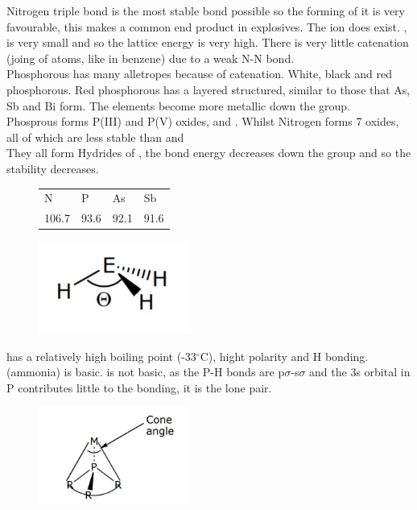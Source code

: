 \documentclass{article}
\begin{document}
    Nitrogen triple bond is the most stable bond possible so the forming of it is very favourable, this makes 
     a common end product in explosives. The  ion does exist. , 
    is very small and so the lattice energy is very high. There is very little catenation (joing of atoms, like in benzene)
    due to a weak N-N bond.\\

    Phosphorous has many alletropes because of catenation. White, black and red phosphorous. 
    Red phosphorous has a layered structured, similar to those that As, Sb and Bi form. The elements become
    more metallic down the group.\\

    Phosprous forms P(III) and P(V) oxides,  and . Whilst Nitrogen forms 7 oxides, all of which
    are less stable than  and \\

    They all form Hydrides of , the bond energy decreases down the group and so the stability decreases.
    \begin{figure}[h]
        \begin{tabular}{l l l l}
            N & P & As & Sb\\
            106.7 & 93.6 & 92.1 & 91.6
        \end{tabular}
        \includegraphics[width=5cm]{eh3.jpg}
    \end{figure}

     has a relatively high boiling point (-33$^\circ$C), hight polarity and H bonding.  (ammonia) is basic.
     is not basic, as the P-H bonds are p$\sigma$-s$\sigma$ and the 3s orbital in P contributes little to the bonding, it is the lone pair.

    \begin{figure}[h]
        \includegraphics[width=5cm]{cone.jpg}
    \end{figure}
\end{document}
